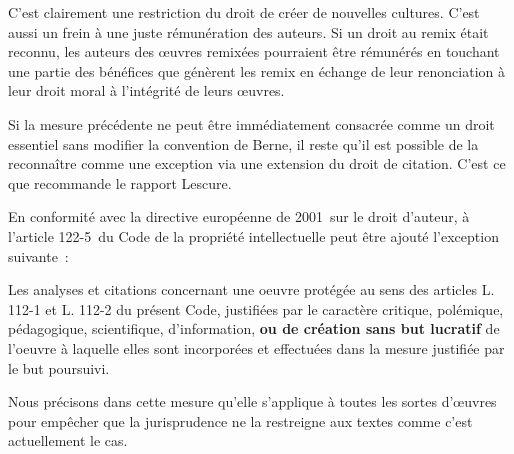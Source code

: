 C’est clairement une restriction du droit de créer de nouvelles cultures. C'est aussi un frein à une juste rémunération des auteurs. Si un droit au remix était reconnu, les auteurs des œuvres remixées pourraient être rémunérés en touchant une partie des bénéfices que génèrent les remix en échange de leur renonciation à leur droit moral à l'intégrité de leurs œuvres.

Si la mesure précédente ne peut être immédiatement consacrée comme un droit essentiel sans modifier la convention de Berne, il reste qu'il est possible de la reconnaître comme une exception via une extension du droit de citation. C'est ce que recommande le rapport Lescure. 

En conformité avec la directive européenne de 2001 sur le droit d'auteur, à l'article 122-5 du Code de la propriété intellectuelle peut être ajouté l'exception suivante~:

\begin{mesure}
Les analyses et citations concernant une oeuvre protégée au sens des articles L. 112-1 et L. 112-2 du présent Code, justifiées par le caractère critique, polémique, pédagogique, scientifique, d’information, \textbf{ou de création sans but lucratif} de l’oeuvre à laquelle elles sont incorporées et effectuées dans la mesure justifiée par le but poursuivi.
\end{mesure}

Nous précisons dans cette mesure qu'elle s'applique à toutes les sortes d'œuvres pour empêcher que la jurisprudence ne la restreigne aux textes comme c'est actuellement le cas.


